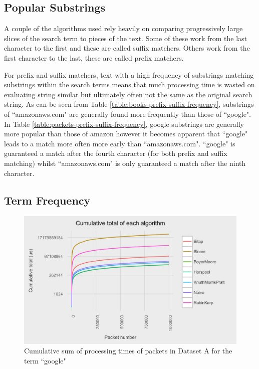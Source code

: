 \documentclass{article}
\begin{document}
\subsection{Popular Substrings}

A couple of the algorithms used rely heavily on comparing progressively large slices of the search term to pieces of the text. Some of these work from the last character to the first and these are called suffix matchers. Others work from the first character to the last, these are called prefix matchers. 

For prefix and suffix matchers, text with a high frequency of substrings matching substrings within the search terms means that much processing time is wasted on evaluating string similar but ultimately often not the same as the original search string. As can be seen from Table \ref{table:books-prefix-suffix-frequency}, substrings of ``amazonaws.com" are generally found more frequently than those of ``google". In Table \ref{table:packets-prefix-suffix-frequency}, google substrings are generally more popular than those of amazon however it becomes apparent that ``google" leads to a match more often more early than ``amazonaws.com". ``google" is guaranteed a match after the fourth character (for both prefix and suffix matching) whilst ``amazonaws.com" is only guaranteed a match after the ninth character.

\subsection{Term Frequency}



\begin{figure}[h!bt]
  \centering
  \includegraphics[width=\textwidth]{graphs/cum_sum_packets_google.png}
  \caption{Cumulative sum of processing times of packets in Dataset A for the term ``google"}
\end{figure}
\end{document}
